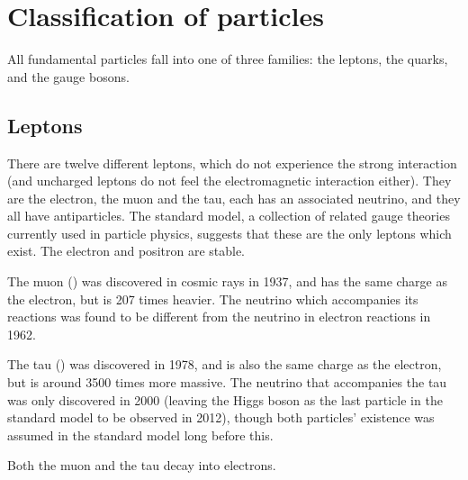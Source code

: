 \section{Classification of particles}
All fundamental particles fall into one of three families: the leptons, the quarks, and the gauge bosons.

\subsection{Leptons}

There are twelve different leptons, which do not experience the strong interaction (and uncharged leptons do not feel the electromagnetic interaction either).  They are the electron, the muon and the tau, each has an associated neutrino, and they all have antiparticles.  The standard model, a collection of related gauge theories currently used in particle physics, suggests that these are the only leptons which exist.  The electron and positron are stable.

The muon (\Pmuon) was discovered in cosmic rays in 1937, and has the same charge as the electron, but is 207 times heavier.  The neutrino which accompanies its reactions was found to be different from the neutrino in electron reactions in 1962.

The tau (\Ptauon) was discovered in 1978, and is also the same charge as the electron, but is around 3500 times more massive.  The neutrino that accompanies the tau was only discovered in 2000 (leaving the Higgs boson as the last particle in the standard model to be observed in 2012), though both particles' existence was assumed in the standard model long before this.

Both the muon and the tau decay into electrons.

